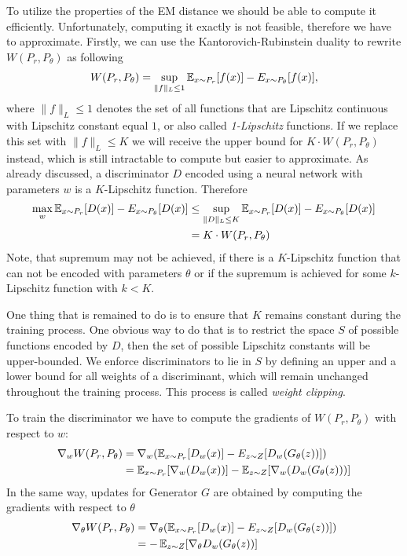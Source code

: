 To utilize the properties of the EM distance we should be able to compute it efficiently. Unfortunately, computing it exactly is not feasible, therefore we have to approximate. 
Firstly, we can use the Kantorovich-Rubinstein duality to rewrite $W(P_r, P_\theta)$ as following
\begin{equation}
	W(P_r, P_\theta) = \sup_{\lVert f \lVert_L \leq 1} \operatorname{\mathbb{E}}_{x \sim P_r}[f(x)] - E_{x \sim P_\theta} [f(x)],	
\end{equation}
where ${\lVert f \lVert_L \leq 1}$ denotes the set of all functions that are Lipschitz continuous with Lipschitz constant equal $1$, or also called \textit{1-Lipschitz} functions. If we replace this set with ${\lVert f \lVert_L \leq K}$ we will receive the upper bound for $K \cdot W(P_r, P_\theta)$ instead, which is still intractable to compute but easier to approximate. As already discussed, a discriminator $D$  encoded using a neural network with parameters $w$ is a $K$-Lipschitz function. Therefore
\begin{align*}
\max_w \operatorname{\mathbb{E}}_{x \sim P_r}[D(x)] - E_{x \sim P_\theta} [D(x)] &\leq \sup_{\lVert D \lVert_L \leq K} \operatorname{\mathbb{E}}_{x \sim P_r}[D(x)] - E_{x \sim P_\theta} [D(x)] \\
 &= K \cdot W(P_r, P_\theta)
\end{align*}
Note, that supremum may not be achieved, if there is a $K$-Lipschitz function that can not be encoded with parameters $\theta$ or if the supremum is achieved for some $k$-Lipschitz function with $k < K$.

One thing that is remained to do is to ensure that $K$ remains constant during the training process. One obvious way to do that is to restrict the space $S$ of possible functions encoded by $D$, then the set of possible Lipschitz constants will be upper-bounded. We enforce discriminators to lie in $S$ by defining an upper and a lower bound for all weights of a discriminant, which will remain unchanged throughout the training process. This process is called \textit{weight clipping}.
 
To train the discriminator we have to compute the gradients of $W(P_r, P_\theta)$ with respect to $w$:
\begin{align*}
	\nabla_w W(P_r, P_\theta) &= \nabla_w(\operatorname{\mathbb{E}}_{x \sim P_r}[D_w(x)] - E_{z \sim Z} [D_w(G_\theta(z))]) \\
&= \operatorname{\mathbb{E}}_{x \sim P_r}[\nabla_w(D_w(x))] - \operatorname{\mathbb{E}}_{z \sim Z} [\nabla_w(D_w(G_\theta(z)))]
\end{align*} 
In the same way, updates for Generator $G$ are obtained by computing the gradients with respect to $\theta$ 
\begin{align*}
\nabla_\theta W(P_r, P_\theta) &= \nabla_\theta(\operatorname{\mathbb{E}}_{x \sim P_r}[D_w(x)] - E_{z \sim Z} [D_w(G_\theta(z))]) \\
&= - \operatorname{\mathbb{E}}_{z \sim Z} [\nabla_\theta D_w(G_\theta(z))]
\end{align*}

